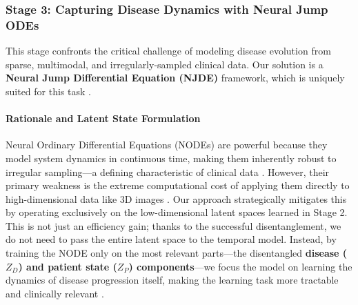 \documentclass[11pt, a4paper]{article}
\begin{document}
\subsubsection{Stage 3: Capturing Disease Dynamics with Neural Jump ODEs}
This stage confronts the critical challenge of modeling disease evolution from sparse, multimodal, and irregularly-sampled clinical data. Our solution is a \textbf{Neural Jump Differential Equation (NJDE)} framework, which is uniquely suited for this task \cite{GwakSim2020}.

\paragraph{Rationale and Latent State Formulation}
Neural Ordinary Differential Equations (NODEs) are powerful because they model system dynamics in continuous time, making them inherently robust to irregular sampling—a defining characteristic of clinical data \cite{GwakSim2020, JohnsonBulgarelli2023, BelogolovskyGreenberg2023}. However, their primary weakness is the extreme computational cost of applying them directly to high-dimensional data like 3D images \cite{WiewelBecher2018, DavisChoromanski2020}. Our approach strategically mitigates this by operating exclusively on the low-dimensional latent spaces learned in Stage 2. This is not just an efficiency gain; thanks to the successful disentanglement, we do not need to pass the entire latent space to the temporal model. Instead, by training the NODE only on the most relevant parts—the disentangled \textbf{disease ($Z_D$) and patient state ($Z_P$) components}—we focus the model on learning the dynamics of disease progression itself, making the learning task more tractable and clinically relevant \cite{AshmanSo2020, KberKalisch2023, LosadaTerranova2024}.
\end{document}
